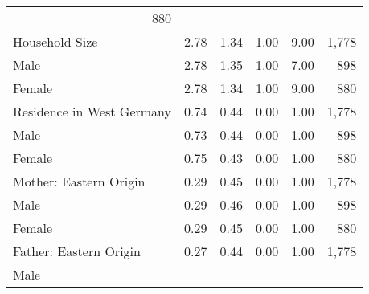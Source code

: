 \documentclass{article}
\begin{document}
\begin{table}[!h]
{\begin{tabular}{llllll}
  \multicolumn{1}{r}{880} \\
\multicolumn{1}{l}{Household Size} &
  \multicolumn{1}{r}{2.78} &
  \multicolumn{1}{r}{1.34} &
  \multicolumn{1}{r}{1.00} &
  \multicolumn{1}{r}{9.00} &
  \multicolumn{1}{r}{1,778} \\
\multicolumn{1}{l}{\hspace{1em}Male} &
  \multicolumn{1}{r}{2.78} &
  \multicolumn{1}{r}{1.35} &
  \multicolumn{1}{r}{1.00} &
  \multicolumn{1}{r}{7.00} &
  \multicolumn{1}{r}{898} \\
\multicolumn{1}{l}{\hspace{1em}Female} &
  \multicolumn{1}{r}{2.78} &
  \multicolumn{1}{r}{1.34} &
  \multicolumn{1}{r}{1.00} &
  \multicolumn{1}{r}{9.00} &
  \multicolumn{1}{r}{880} \\
\multicolumn{1}{l}{Residence in West Germany} &
  \multicolumn{1}{r}{0.74} &
  \multicolumn{1}{r}{0.44} &
  \multicolumn{1}{r}{0.00} &
  \multicolumn{1}{r}{1.00} &
  \multicolumn{1}{r}{1,778} \\
\multicolumn{1}{l}{\hspace{1em}Male} &
  \multicolumn{1}{r}{0.73} &
  \multicolumn{1}{r}{0.44} &
  \multicolumn{1}{r}{0.00} &
  \multicolumn{1}{r}{1.00} &
  \multicolumn{1}{r}{898} \\
\multicolumn{1}{l}{\hspace{1em}Female} &
  \multicolumn{1}{r}{0.75} &
  \multicolumn{1}{r}{0.43} &
  \multicolumn{1}{r}{0.00} &
  \multicolumn{1}{r}{1.00} &
  \multicolumn{1}{r}{880} \\
\multicolumn{1}{l}{Mother: Eastern Origin} &
  \multicolumn{1}{r}{0.29} &
  \multicolumn{1}{r}{0.45} &
  \multicolumn{1}{r}{0.00} &
  \multicolumn{1}{r}{1.00} &
  \multicolumn{1}{r}{1,778} \\
\multicolumn{1}{l}{\hspace{1em}Male} &
  \multicolumn{1}{r}{0.29} &
  \multicolumn{1}{r}{0.46} &
  \multicolumn{1}{r}{0.00} &
  \multicolumn{1}{r}{1.00} &
  \multicolumn{1}{r}{898} \\
\multicolumn{1}{l}{\hspace{1em}Female} &
  \multicolumn{1}{r}{0.29} &
  \multicolumn{1}{r}{0.45} &
  \multicolumn{1}{r}{0.00} &
  \multicolumn{1}{r}{1.00} &
  \multicolumn{1}{r}{880} \\
\multicolumn{1}{l}{Father: Eastern Origin} &
  \multicolumn{1}{r}{0.27} &
  \multicolumn{1}{r}{0.44} &
  \multicolumn{1}{r}{0.00} &
  \multicolumn{1}{r}{1.00} &
  \multicolumn{1}{r}{1,778} \\
\multicolumn{1}{l}{\hspace{1em}Male} &

\end{tabular}}
\end{table}
\end{document}
